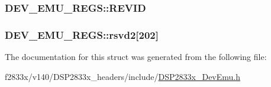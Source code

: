 \subsubsection[{R\+E\+V\+I\+D}]{ D\+E\+V\+\_\+\+E\+M\+U\+\_\+\+R\+E\+G\+S\+::\+R\+E\+V\+I\+D}\label{struct_d_e_v___e_m_u___r_e_g_s_ab3b9758bbe253258d9544e41fb43a4a8}
\hypertarget{struct_d_e_v___e_m_u___r_e_g_s_ad16c9b7d67f8bb13f6bfe71fe47fe5f4}{}
\subsubsection[{rsvd2}]{ D\+E\+V\+\_\+\+E\+M\+U\+\_\+\+R\+E\+G\+S\+::rsvd2\mbox{[}202\mbox{]}}\label{struct_d_e_v___e_m_u___r_e_g_s_ad16c9b7d67f8bb13f6bfe71fe47fe5f4}


The documentation for this struct was generated from the following file\+:\begin{DoxyCompactItemize}
\item 
f2833x/v140/\+D\+S\+P2833x\+\_\+headers/include/\hyperlink{_d_s_p2833x___dev_emu_8h}{D\+S\+P2833x\+\_\+\+Dev\+Emu.\+h}\end{DoxyCompactItemize}
